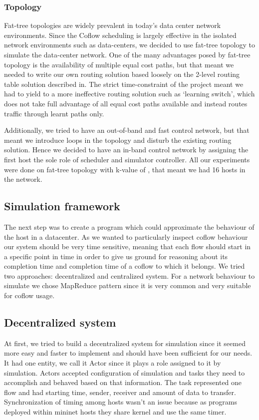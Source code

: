 \documentclass[conference]{IEEEtran}
\begin{document}
\subsubsection{Topology}
Fat-tree topologies are widely prevalent in today’s data center network environments. Since the Coflow scheduling is largely effective in the isolated network environments such as data-centers, we decided to use fat-tree topology to simulate the data-center network. One of the many advantages posed by fat-tree topology is the availability of multiple equal cost paths, but that meant we needed to write our own routing solution based loosely on the 2-level routing table solution described in. The strict time-constraint of the project meant we had to yield to a more ineffective routing solution such as ‘learning switch’, which does not take full advantage of all equal cost paths available and instead routes traffic through learnt paths only. 

Additionally, we tried to have an out-of-band and fast control network, but that meant we introduce loops in the topology and disturb the existing routing solution. Hence we decided to have an in-band control network by assigning the first host the sole role of scheduler and simulator controller. All our experiments were done on fat-tree topology with k-value of , that meant we had 16 hosts in the network.

\subsection{Simulation framework}
The next step was to create a program which could approximate the behaviour of the host in a datacenter. As we wanted to particularly inspect coflow behaviour our system should be very time sensitive, meaning that each flow should start in a specific point in time in order to give us ground for reasoning about its completion time and completion time of a coflow to which it belongs. We tried two approaches: decentralized and centralized system. For a network behaviour to simulate we chose MapReduce pattern since it is very common and very suitable for coflow usage.

\subsection{Decentralized system}
At first, we tried to build a decentralized system for simulation since it seemed more easy and faster to implement and should have been sufficient for our needs. It had one entity, we call it Actor since it plays a role assigned to it by simulation. Actors accepted configuration of simulation and tasks they need to accomplish and behaved based on that information. The task represented one flow and had starting time, sender, receiver and amount of data to transfer. Synchronization of timing among hosts wasn’t an issue because as programs deployed within mininet hosts they share kernel and use the same timer. 
\end{document}
